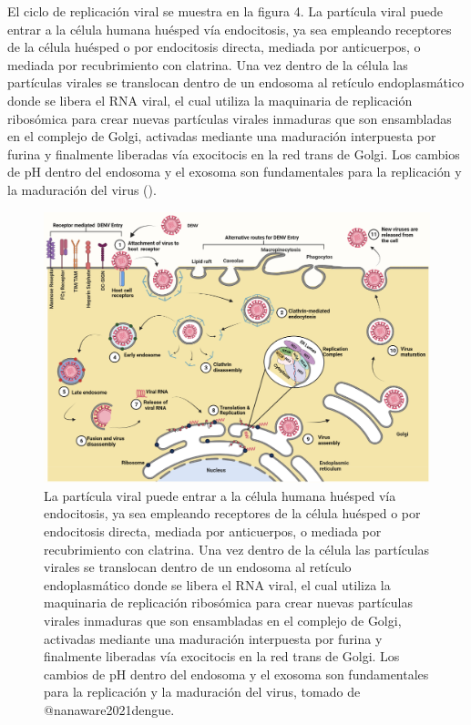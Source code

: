 \documentclass[
  12pt, krantz2,
  spanish,
]{krantz}
\begin{document}
El ciclo de replicación viral se muestra en la figura 4. La partícula viral puede entrar a la célula humana huésped vía endocitosis, ya sea empleando receptores de la célula huésped o por endocitosis directa, mediada por anticuerpos, o mediada por recubrimiento con clatrina. Una vez dentro de la célula las partículas virales se translocan dentro de un endosoma al retículo endoplasmático donde se libera el RNA viral, el cual utiliza la maquinaria de replicación ribosómica para crear nuevas partículas virales inmaduras que son ensambladas en el complejo de Golgi, activadas mediante una maduración interpuesta por furina y finalmente liberadas vía exocitocis en la red trans de Golgi. Los cambios de pH dentro del endosoma y el exosoma son fundamentales para la replicación y la maduración del virus (\citet{nanaware2021dengue}).

\begin{figure}
\includegraphics[width=0.8\linewidth]{figures/DenvFigura4} \caption{ La partícula viral puede entrar a la célula humana huésped vía endocitosis, ya sea empleando receptores de la célula huésped o por endocitosis directa, mediada por anticuerpos, o mediada por recubrimiento con clatrina. Una vez dentro de la célula las partículas virales se translocan dentro de un endosoma al retículo endoplasmático donde se libera el RNA viral, el cual utiliza la maquinaria de replicación ribosómica para crear nuevas partículas virales inmaduras que son ensambladas en el complejo de Golgi, activadas mediante una maduración interpuesta por furina y finalmente liberadas vía exocitocis en la red trans de Golgi. Los cambios de pH dentro del endosoma y el exosoma son fundamentales para la replicación y la maduración del virus, tomado de @nanaware2021dengue.}\label{fig:DenvCiclo}
\end{figure}
\end{document}
